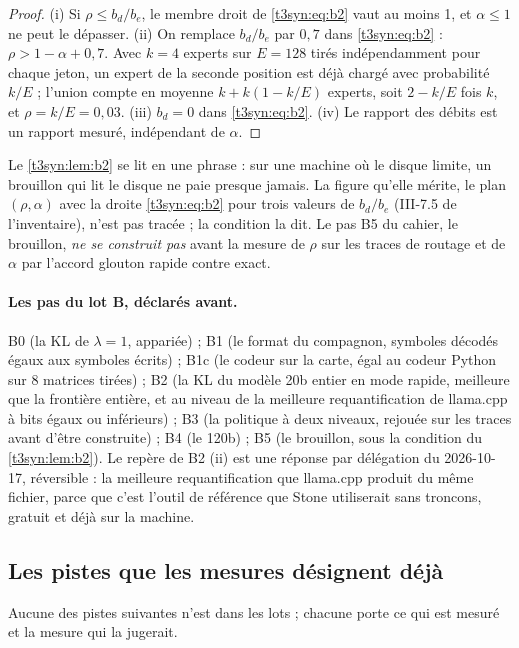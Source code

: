 \begin{proof}
(i) Si $\rho \le b_d/b_e$, le membre droit de \eqref{t3syn:eq:b2} vaut au moins 1, et $\alpha \le 1$ ne peut le dépasser. (ii) On remplace $b_d/b_e$ par $0{,}7$ dans \eqref{t3syn:eq:b2} : $\rho > 1 - \alpha + 0{,}7$. Avec $k = 4$ experts sur $E = 128$ tirés indépendamment pour chaque jeton, un expert de la seconde position est déjà chargé avec probabilité $k/E$ ; l'union compte en moyenne $k + k(1 - k/E)$ experts, soit $2 - k/E$ fois $k$, et $\rho = k/E = 0{,}03$. (iii) $b_d = 0$ dans \eqref{t3syn:eq:b2}. (iv) Le rapport des débits est un rapport mesuré, indépendant de $\alpha$.
\end{proof}

Le \cref{t3syn:lem:b2} se lit en une phrase : sur une machine où le disque limite, un brouillon qui lit le disque ne paie presque jamais. La figure qu'elle mérite, le plan $(\rho, \alpha)$ avec la droite \eqref{t3syn:eq:b2} pour trois valeurs de $b_d/b_e$ (III-7.5 de l'inventaire), n'est pas tracée ; la condition la dit. Le pas B5 du cahier, le brouillon, \emph{ne se construit pas} avant la mesure de $\rho$ sur les traces de routage et de $\alpha$ par l'accord glouton rapide contre exact.

\paragraph{Les pas du lot B, déclarés avant.} B0 (la KL de $\lambda = 1$, appariée) ; B1 (le format du compagnon, symboles décodés égaux aux symboles écrits) ; B1c (le codeur sur la carte, égal au codeur Python sur 8 matrices tirées) ; B2 (la KL du modèle 20b entier en mode rapide, meilleure que la frontière entière, et au niveau de la meilleure requantification de llama.cpp à bits égaux ou inférieurs) ; B3 (la politique à deux niveaux, rejouée sur les traces avant d'être construite) ; B4 (le 120b) ; B5 (le brouillon, sous la condition du \cref{t3syn:lem:b2}). Le repère de B2 (ii) est une réponse par délégation du 2026-10-17, réversible : la meilleure requantification que llama.cpp produit du même fichier, parce que c'est l'outil de référence que Stone utiliserait sans troncons, gratuit et déjà sur la machine.

\subsection{Les pistes que les mesures désignent déjà}

Aucune des pistes suivantes n'est dans les lots ; chacune porte ce qui est mesuré et la mesure qui la jugerait.

